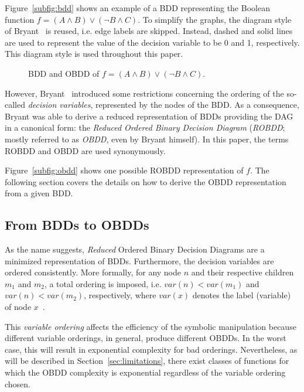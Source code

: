\documentclass{vldb}
\begin{document}
Figure~\ref{subfig:bdd} shows an example of a BDD representing the Boolean function
$f=(A \land B) \lor (\neg B \land C)$. To simplify the graphs, the diagram style of
Bryant~\cite{BRYANT92} is reused, i.e. edge labels are skipped. Instead, dashed
and solid lines are used to represent the value of the decision variable to be 0
and 1, respectively. This diagram style is used throughout this paper.

\begin{figure}[ht]
    \centering
    \subfigure[BDD]{
        
        \label{subfig:bdd}
    }
    \hskip1cm
    \subfigure[OBDD]{
        
        \label{subfig:obdd}
    }
    \caption{BDD and OBDD of $f=(A \land B) \lor (\neg B \land C)$.}
    \label{fig:bdd-and-obdd}
\end{figure}

However, Bryant~\cite{BRYANT86} introduced some restrictions concerning the
ordering of the so-called \textit{decision variables}, represented by the nodes
of the BDD. As a consequence, Bryant\cite{BRYANT86} was able to derive a reduced
representation of BDDs providing the DAG in a canonical form: the
\textit{Reduced Ordered Binary Decision Diagram} (\textit{ROBDD}; mostly referred
to as \textit{OBDD}, even by Bryant himself). In this paper, the terms ROBDD and
OBDD are used synonymously.

Figure~\ref{subfig:obdd} shows one possible ROBDD representation of $f$. The
following section covers the details on how to derive the OBDD representation
from a given BDD.

\subsection{From BDDs to OBDDs}
\label{subsec:from-bdds-to-obdds}

As the name suggests, \textit{Reduced} Ordered Binary Decision Diagrams are a 
minimized representation of BDDs. Furthermore, the decision variables are ordered
consistently. More formally, for any node $n$ and their respective children $m_1$
and $m_2$, a total ordering is imposed, i.e. $var(n) < var(m_1)$ and
$var(n) < var(m_2)$, respectively, where $var(x)$ denotes the label (variable)
of node $x$~\cite{BRYANT86, BRYANT92}.

This \textit{variable ordering} affects the efficiency of the symbolic
manipulation because different variable orderings, in general, produce different
OBDDs. In the worst case, this will result in exponential complexity for bad
orderings. Nevertheless, as will be described in Section~\ref{sec:limitations},
there exist classes of functions for which the OBDD complexity is exponential
regardless of the variable ordering chosen.
\end{document}
